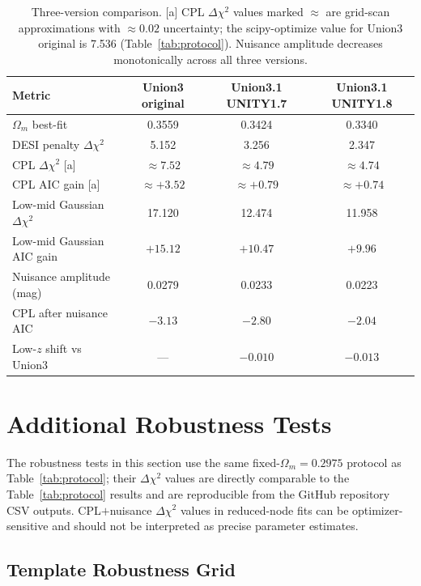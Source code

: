 \documentclass[11pt]{article}
\begin{document}
\begin{table}[h]
\centering
\caption{Three-version comparison. [a] CPL $\Delta\chi^2$ values marked $\approx$ are
grid-scan approximations with $\approx0.02$ uncertainty; the scipy-optimize value for
Union3 original is 7.536 (Table~\ref{tab:protocol}). Nuisance amplitude decreases
monotonically across all three versions.}
\label{tab:threeversion}
\begin{tabular}{lccc}
\toprule
Metric & Union3 original & Union3.1 UNITY1.7 & Union3.1 UNITY1.8 \\
\midrule
$\Omega_m$ best-fit & 0.3559 & 0.3424 & 0.3340 \\
DESI penalty $\Delta\chi^2$ & 5.152 & 3.256 & 2.347 \\
CPL $\Delta\chi^2$ [a] & $\approx7.52$ & $\approx4.79$ & $\approx4.74$ \\
CPL AIC gain [a] & $\approx+3.52$ & $\approx+0.79$ & $\approx+0.74$ \\
Low-mid Gaussian $\Delta\chi^2$ & 17.120 & 12.474 & 11.958 \\
Low-mid Gaussian AIC gain & $+15.12$ & $+10.47$ & $+9.96$ \\
Nuisance amplitude (mag) & 0.0279 & 0.0233 & 0.0223 \\
CPL after nuisance AIC & $-3.13$ & $-2.80$ & $-2.04$ \\
Low-$z$ shift vs Union3 & --- & $-0.010$ & $-0.013$ \\
\bottomrule
\end{tabular}
\end{table}

\section{Additional Robustness Tests}

The robustness tests in this section use the same fixed-$\Omega_m=0.2975$ protocol as
Table~\ref{tab:protocol}; their $\Delta\chi^2$ values are directly comparable to the
Table~\ref{tab:protocol} results and are reproducible from the GitHub repository CSV
outputs. CPL$+$nuisance $\Delta\chi^2$ values in reduced-node fits can be
optimizer-sensitive and should not be interpreted as precise parameter estimates.

\subsection{Template Robustness Grid}
\end{document}
